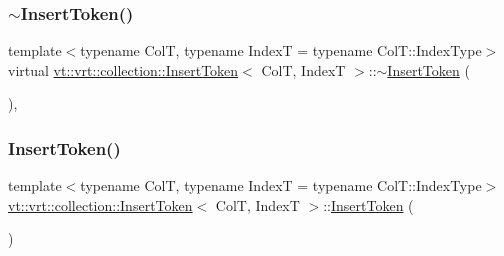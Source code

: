 \subsubsection{\texorpdfstring{$\sim$\+Insert\+Token()}{~InsertToken()}}
{\footnotesize\ttfamily template$<$typename ColT, typename IndexT = typename Col\+T\+::\+Index\+Type$>$ \\
virtual \hyperlink{structvt_1_1vrt_1_1collection_1_1_insert_token}{vt\+::vrt\+::collection\+::\+Insert\+Token}$<$ ColT, IndexT $>$\+::$\sim$\hyperlink{structvt_1_1vrt_1_1collection_1_1_insert_token}{Insert\+Token} (\begin{DoxyParamCaption}{ }\end{DoxyParamCaption})\hspace{0.3cm}{\ttfamily [virtual]}, {\ttfamily [default]}}

\mbox{\label{structvt_1_1vrt_1_1collection_1_1_insert_token_a4adbc8942df683af9d99216c7d2a40d1}} 
\subsubsection{\texorpdfstring{Insert\+Token()}{InsertToken()}\hspace{0.1cm}{\footnotesize\ttfamily [1/2]}}
{\footnotesize\ttfamily template$<$typename ColT, typename IndexT = typename Col\+T\+::\+Index\+Type$>$ \\
\hyperlink{structvt_1_1vrt_1_1collection_1_1_insert_token}{vt\+::vrt\+::collection\+::\+Insert\+Token}$<$ ColT, IndexT $>$\+::\hyperlink{structvt_1_1vrt_1_1collection_1_1_insert_token}{Insert\+Token} (\begin{DoxyParamCaption}\item[{\hyperlink{structvt_1_1vrt_1_1collection_1_1_insert_token}{Insert\+Token}$<$ ColT, IndexT $>$ const \&}]{ }\end{DoxyParamCaption})\hspace{0.3cm}{\ttfamily [delete]}}

\mbox{\label{structvt_1_1vrt_1_1collection_1_1_insert_token_a69f1ea2a33fab61d960c39da57fc0486}} 
